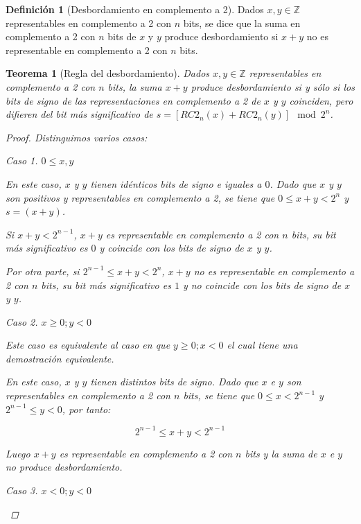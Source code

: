 \documentclass[spanish,a4paper,12pt,titlepage]{article}
\newtheorem{theorem}{Teorema}%
\theoremstyle{definition}
\newtheorem{definition}{Definición}%
\theoremstyle{remark}
\newtheorem{case}{Caso}
\newcommand{\bbZ}{\mathbb{Z}}
\begin{document}
\begin{definition}[Desbordamiento en complemento a 2]
  Dados $x, y \in \bbZ$ representables en complemento a 2 con $n$ bits, se dice que la suma en complemento a 2 con $n$ bits de $x$ y $y$ produce desbordamiento si $x+y$ no es representable en complemento a 2 con $n$ bits.
\end{definition}

\begin{theorem}[Regla del desbordamiento]\label{theorem-overflow-law}
  Dados $x, y \in \bbZ$ representables en complemento a 2 con $n$ bits, la suma $x+y$ produce desbordamiento si y sólo si los bits de signo de las representaciones en complemento a 2 de $x$ y $y$ coinciden, pero difieren del bit más significativo de $s = [RC2_n(x)+RC2_n(y)] \mod 2^n$.
  \begin{proof}
    Distinguimos varios casos:

    \begin{case}
      $0 \le x,y$

      En este caso, $x$ y $y$ tienen idénticos bits de signo e iguales a $0$. Dado que $x$ y $y$ son positivos y representables en complemento a 2, se tiene que $0 \le x+y < 2^n$ y $s = (x + y)$.

      Si $x+y < 2^{n-1}$, $x+y$ es representable en complemento a 2 con $n$ bits, su bit más significativo es $0$ y coincide con los bits de signo de $x$ y $y$.

      Por otra parte, si $2^{n-1} \le x+y < 2^n$, $x+y$ no es representable en complemento a 2 con $n$ bits, su bit más significativo es $1$ y no coincide con los bits de signo de $x$ y $y$.
    \end{case}

    \begin{case}
      $x \ge 0; y < 0$

      Este caso es equivalente al caso en que $y \ge 0; x < 0$ el cual tiene una demostración equivalente.

      En este caso, $x$ y $y$ tienen distintos bits de signo. Dado que $x$ e $y$ son representables en complemento a 2 con $n$ bits, se tiene que $0 \le x < 2^{n-1}$ y $2^{n-1} \le y < 0$, por tanto:

      \[
        2^{n-1} \le x + y < 2^{n-1}
      \]

      Luego $x+y$ es representable en complemento a 2 con $n$ bits y la suma de $x$ e $y$ no produce desbordamiento.
    \end{case}

    \begin{case}
      $x < 0; y < 0$


\end{case}
\end{proof}
\end{theorem}
\end{document}
